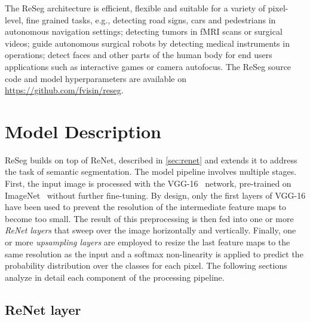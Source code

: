 The ReSeg architecture is efficient, flexible and suitable for a variety of
pixel-level, fine grained tasks, e.g., detecting road signs, cars and
pedestrians in autonomous navigation settings; detecting tumors in fMRI scans
or surgical videos; guide autonomous surgical robots by detecting medical
instruments in operations; detect faces and other parts of the human body for
end users applications such as interactive games or camera autofocus.
The ReSeg source code and model hyperparameters are available on
\href{https://github.com/fvisin/reseg}{https://github.com/fvisin/reseg}.


\section{Model Description}\label{sec:reseg_model}

ReSeg builds on top of ReNet, described in \autoref{sec:renet} and
extends it to address the task of semantic segmentation. The model pipeline
involves multiple stages. First, the input image is processed with the
VGG-16~\citep{Simonyan2015} network, pre-trained on
ImageNet~\citep{imagenet_cvpr09} without further fine-tuning. By design, only
the first layers of VGG-16 have been used to prevent the resolution of the
intermediate feature maps to become too small.  The result of this
preprocessing is then fed into one or more \emph{ReNet layers} that sweep over
the image horizontally and vertically. Finally, one or more \emph{upsampling
layers} are employed to resize the last feature maps to the same resolution as
the input and a softmax non-linearity is applied to predict the probability
distribution over the classes for each pixel. The following sections analyze in
detail each component of the processing pipeline.

\subsection{ReNet layer}

